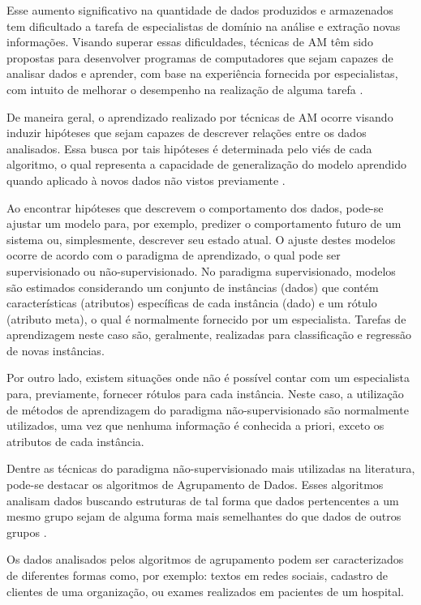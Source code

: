 \documentclass[qual, classic, a4paper]{ufbathesis}
\begin{document}
Esse aumento significativo na quantidade de dados produzidos e armazenados tem dificultado a tarefa de especialistas de domínio na análise e extração novas informações. Visando superar essas dificuldades, técnicas de \ac{AM} têm sido propostas para desenvolver programas de computadores que sejam capazes de analisar dados e aprender, com base na experiência fornecida por especialistas, com intuito de melhorar o desempenho na realização de alguma tarefa \cite{Mitchell:1997:ML:541177,faceli2011inteligencia}. 

De maneira geral, o aprendizado realizado por técnicas de \ac{AM} ocorre visando induzir hipóteses que sejam capazes de descrever relações entre os dados analisados. Essa busca por tais hipóteses é determinada pelo viés de cada algoritmo, o qual representa a capacidade de generalização do modelo aprendido quando aplicado à novos dados não vistos previamente \cite{faceli2011inteligencia}.

Ao encontrar hipóteses que descrevem o comportamento dos dados, pode-se ajustar um modelo para, por exemplo, predizer o comportamento futuro de um sistema ou, simplesmente, descrever seu estado atual. O ajuste destes modelos ocorre de acordo com o paradigma de aprendizado, o qual pode ser supervisionado ou não-supervisionado. No paradigma supervisionado, modelos são estimados considerando um conjunto de instâncias (dados) que contém características (atributos) específicas de cada instância (dado) e um rótulo (atributo meta), o qual é normalmente fornecido por um especialista. Tarefas de aprendizagem neste caso são, geralmente, realizadas para classificação e regressão de novas instâncias.

Por outro lado, existem situações onde não é possível contar com um especialista para, previamente, fornecer rótulos para cada instância. Neste caso, a utilização de métodos de aprendizagem do paradigma não-supervisionado são normalmente utilizados, uma vez que nenhuma informação é conhecida a priori, exceto os atributos de cada instância.

Dentre as técnicas do paradigma não-supervisionado mais utilizadas na literatura, pode-se destacar os algoritmos de Agrupamento de Dados. Esses algoritmos analisam dados buscando estruturas de tal forma que dados pertencentes a um mesmo grupo sejam de alguma forma mais semelhantes do que dados de outros grupos \cite{Mitchell:1997:ML:541177,faceli2011inteligencia, Aghabozorgi2015}.

Os dados analisados pelos algoritmos de agrupamento podem  ser caracterizados de diferentes formas como, por exemplo:  textos em redes sociais, cadastro de clientes de uma organização, ou exames realizados em pacientes de um hospital. 
\end{document}

